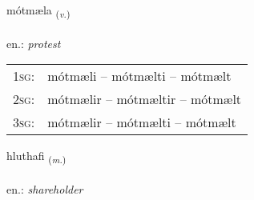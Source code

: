 \documentclass[frontgrid, backgrid]{flacards}\usepackage[]{graphicx}\usepackage[]{xcolor}
\begin{document}
\renewcommand{\flhead}{\vskip5pt \fboxsep=0pt {\small\bfseries\footnotesize Sagnorð | Verb}}
\renewcommand{\fcfoot}{\vskip5pt \fboxsep=0pt \hspace{2pt}{\small\bfseries\footnotesize 2K}}

\renewcommand{\blhead}{\vskip5pt {\small\bfseries\footnotesize Sagnorð | Verb }}
\renewcommand{\bcfoot}{\vskip5pt \hspace{2pt}{\small\bfseries\footnotesize 2K}}


{mótmæla \small{\textsubscript{(\textit{v.})}} \\[1ex] %
\textphonetic{[moutmaila]} \\
en.: \emph{protest} \\  [2ex]
\renewcommand*{\arraystretch}{0.8}
\begin{tabular}{p{1cm}l}
\textsc{1sg}: & mótmæli -- mótmælti -- mótmælt \\ 
\textsc{2sg}: & mótmælir -- mótmæltir -- mótmælt \\ 
\textsc{3sg}: & mótmælir -- mótmælti -- mótmælt \\ 
\end{tabular}
}

\renewcommand{\flhead}{\vskip5pt \fboxsep=0pt {\small\bfseries\footnotesize Nafnorð | Noun}}
\renewcommand{\fcfoot}{\vskip5pt \fboxsep=0pt \hspace{2pt}{\small\bfseries\footnotesize 2K}}

\renewcommand{\blhead}{\vskip5pt {\small\bfseries\footnotesize Nafnorð | Noun }}
\renewcommand{\bcfoot}{\vskip5pt \hspace{2pt}{\small\bfseries\footnotesize 2K}}


{hluthafi \small{\textsubscript{(\textit{m.})}} \\[1ex] %
\textphonetic{[l̥ʏːtavɪ]} \\
en.: \emph{shareholder} \\  [2ex]
\renewcommand*{\arraystretch}{0.8}
}
\end{document}
